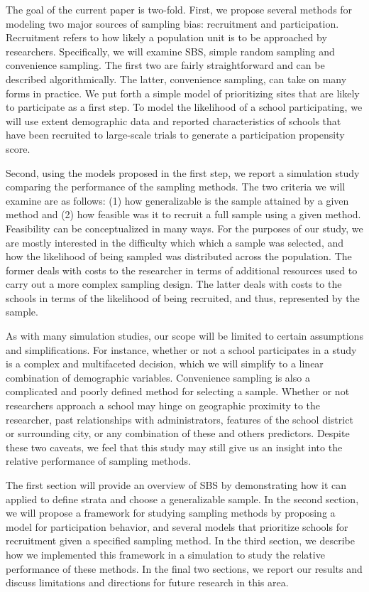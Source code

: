 \documentclass[english,man,floatsintext]{apa6}
\begin{document}
The goal of the current paper is two-fold. First, we propose several methods for modeling two major sources of sampling bias: recruitment and participation. Recruitment refers to how likely a population unit is to be approached by researchers. Specifically, we will examine SBS, simple random sampling and convenience sampling. The first two are fairly straightforward and can be described algorithmically. The latter, convenience sampling, can take on many forms in practice. We put forth a simple model of prioritizing sites that are likely to participate as a first step. To model the likelihood of a school participating, we will use extent demographic data and reported characteristics of schools that have been recruited to large-scale trials to generate a participation propensity score.

Second, using the models proposed in the first step, we report a simulation study comparing the performance of the sampling methods. The two criteria we will examine are as follows: (1) how generalizable is the sample attained by a given method and (2) how feasible was it to recruit a full sample using a given method. Feasibility can be conceptualized in many ways. For the purposes of our study, we are mostly interested in the difficulty which which a sample was selected, and how the likelihood of being sampled was distributed across the population. The former deals with costs to the researcher in terms of additional resources used to carry out a more complex sampling design. The latter deals with costs to the schools in terms of the likelihood of being recruited, and thus, represented by the sample.

As with many simulation studies, our scope will be limited to certain assumptions and simplifications. For instance, whether or not a school participates in a study is a complex and multifaceted decision, which we will simplify to a linear combination of demographic variables. Convenience sampling is also a complicated and poorly defined method for selecting a sample. Whether or not researchers approach a school may hinge on geographic proximity to the researcher, past relationships with administrators, features of the school district or surrounding city, or any combination of these and others predictors. Despite these two caveats, we feel that this study may still give us an insight into the relative performance of sampling methods.

The first section will provide an overview of SBS by demonstrating how it can applied to define strata and choose a generalizable sample. In the second section, we will propose a framework for studying sampling methods by proposing a model for participation behavior, and several models that prioritize schools for recruitment given a specified sampling method. In the third section, we describe how we implemented this framework in a simulation to study the relative performance of these methods. In the final two sections, we report our results and discuss limitations and directions for future research in this area.
\end{document}
